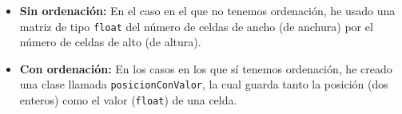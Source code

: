 \begin{itemize}
	\item \textbf{Sin ordenación:} En el caso en el que no tenemos ordenación, he usado una matriz de tipo \texttt{float} del número de celdas de ancho (de anchura) por el número de celdas de alto (de altura).
	\item \textbf{Con ordenación:} En los casos en los que sí tenemos ordenación, he creado una clase llamada \texttt{posicionConValor}, la cual guarda tanto la posición (dos enteros) como el valor (\texttt{float}) de una celda.
	
\end{itemize}